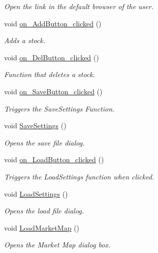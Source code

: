 \begin{DoxyCompactItemize}
\begin{DoxyCompactList}\small\item\em Open the link in the default browser of the user. \end{DoxyCompactList}\item 
void \hyperlink{class_t_k_r_t_a_p_a55ad82b64ab31eba3e8ac1aa56e3645e}{on\+\_\+\+Add\+Button\+\_\+clicked} ()
\begin{DoxyCompactList}\small\item\em Adds a stock. \end{DoxyCompactList}\item 
void \hyperlink{class_t_k_r_t_a_p_a56fe0e3c4f6ba41aa41ee94464a7c6c0}{on\+\_\+\+Del\+Button\+\_\+clicked} ()
\begin{DoxyCompactList}\small\item\em Function that deletes a stock. \end{DoxyCompactList}\item 
void \hyperlink{class_t_k_r_t_a_p_a091ace4c0a198698e146d5e4186adb88}{on\+\_\+\+Save\+Button\+\_\+clicked} ()
\begin{DoxyCompactList}\small\item\em Triggers the Save\+Settings Function. \end{DoxyCompactList}\item 
void \hyperlink{class_t_k_r_t_a_p_a3f0d2df000debf0e3d762cd42309ddd1}{Save\+Settings} ()
\begin{DoxyCompactList}\small\item\em Opens the save file dialog. \end{DoxyCompactList}\item 
void \hyperlink{class_t_k_r_t_a_p_a2c5ded6487aad0d51e3c023d597b6072}{on\+\_\+\+Load\+Button\+\_\+clicked} ()
\begin{DoxyCompactList}\small\item\em Triggers the Load\+Settings function when clicked. \end{DoxyCompactList}\item 
void \hyperlink{class_t_k_r_t_a_p_a15cd045fcc12644e07291ef00c9bc6f5}{Load\+Settings} ()
\begin{DoxyCompactList}\small\item\em Opens the load file dialog. \end{DoxyCompactList}\item 
void \hyperlink{class_t_k_r_t_a_p_a5978ee276d97cfbdac62aa6a825d4449}{Load\+Market\+Map} ()
\begin{DoxyCompactList}\small\item\em Opens the Market Map dialog box. \end{DoxyCompactList}\item 

\end{DoxyCompactItemize}
